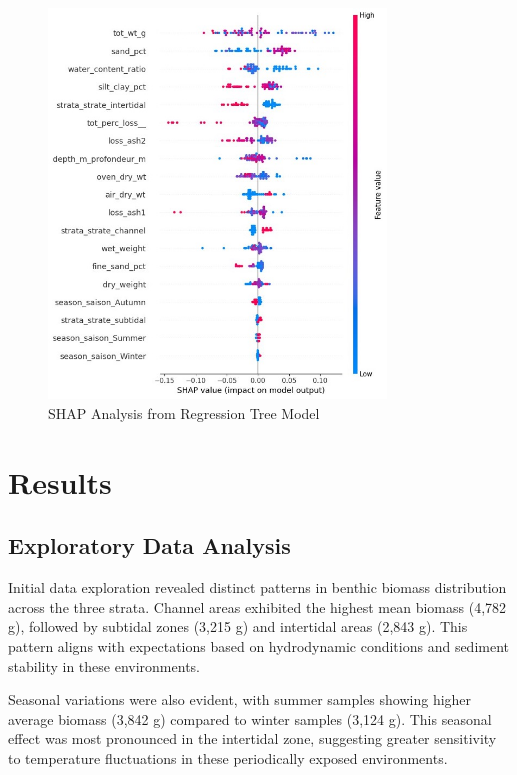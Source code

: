 \documentclass[12pt]{article}
\begin{document}
\begin{figure}[H]
\centering
\includegraphics[width=0.8\textwidth]{SHAP-analysis-from-regression-tree.jpg}
\caption{SHAP Analysis from Regression Tree Model}
\label{fig:shap-analysis}
\end{figure}


\newpage
\section{Results}
\subsection{Exploratory Data Analysis}

\qquad Initial data exploration revealed distinct patterns in benthic biomass
distribution across the three strata. Channel areas exhibited the highest mean
biomass (4,782 g), followed by subtidal zones (3,215 g) and intertidal areas
(2,843 g). This pattern aligns with expectations based on hydrodynamic
conditions and sediment stability in these environments.

\qquad Seasonal variations were also evident, with summer samples showing higher
average biomass (3,842 g) compared to winter samples (3,124 g). This seasonal
effect was most pronounced in the intertidal zone, suggesting greater
sensitivity to temperature fluctuations in these periodically exposed
environments.
\end{document}
